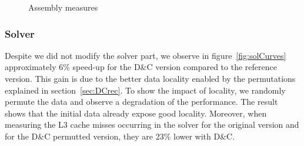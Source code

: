 \documentclass{IOS-Book-Article}
\begin{document}
\begin{figure}[htp]
 \centering
 \caption{Assembly measures}
 \label{fig:asmCurves}
\end{figure}

\subsubsection{Solver}
Despite we did not modify the solver part, we observe in figure~\ref{fig:solCurves} approximately 6\% speed-up for the D\&C version compared to the reference version.
This gain is due to the better data locality enabled by the permutations explained in section~\ref{sec:DCrec}.
To show the impact of locality, we randomly permute the data and observe a degradation of the performance.
The result shows that the initial data already expose good locality.
Moreover, when measuring the L3 cache misses occurring in the solver for the original version and for the D\&C permutted version, they are 23\% lower with D\&C.
\end{document}
